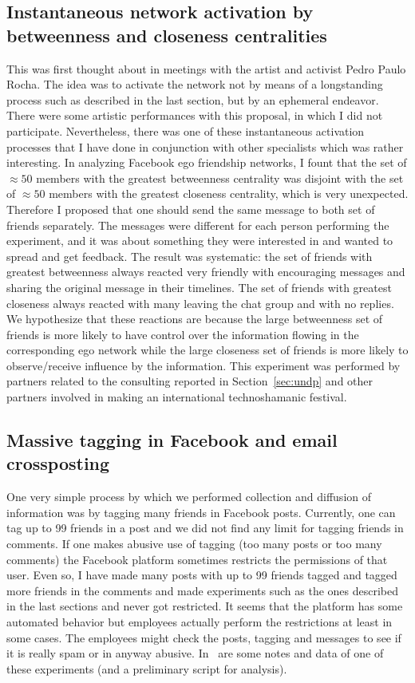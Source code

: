 \begin{apendicesenv}
\subsection{Instantaneous network activation by betweenness and closeness centralities}
This was first thought about in meetings with the artist and activist Pedro Paulo Rocha.
The idea was to activate the network not by means of a longstanding process such
as described in the last section, but by an ephemeral endeavor.
There were some artistic performances with this proposal, in which I did
not participate.
Nevertheless, there was one of these instantaneous activation processes that
I have done in conjunction with other specialists which was rather interesting.
In analyzing Facebook ego friendship networks, I fount that the set of $\approx 50$ members with
the greatest betweenness centrality was disjoint with the set of $\approx 50$ members
with the greatest closeness centrality, which is very unexpected.
Therefore I proposed that one should send the same message to both set of friends separately.
The messages were different for each person performing the experiment,
and it was about something they were interested in and wanted to spread and get feedback.
The result was systematic: the set of friends with greatest betweenness always reacted very friendly
with encouraging messages and sharing the original message in their timelines.
The set of friends with greatest closeness always reacted with many leaving the chat group
and with no replies.
We hypothesize that these reactions are because the large betweenness set of friends is more
likely to have control over the information flowing in the corresponding ego network while
the large closeness set of friends is more likely to observe/receive influence by the information.
This experiment was performed by partners related to the consulting reported in Section~\ref{sec:undp}
and other partners involved in making an international technoshamanic festival.

\subsection{Massive tagging in Facebook and email crossposting}
One very simple process by which we performed collection and diffusion of information
was by tagging many friends in Facebook posts.
Currently, one can tag up to 99 friends in a post
and we did not find any limit for tagging friends in comments.
If one makes abusive use of tagging (too many posts or too many comments)
the Facebook platform sometimes restricts the permissions of that user.
Even so, I have made many posts with up to 99 friends tagged and tagged more
friends in the comments and made experiments such as the ones described in the
last sections and never got restricted.
It seems that the platform has some automated behavior but employees actually
perform the restrictions at least in some cases.
The employees might check the posts, tagging and messages to see if it is
really spam or in anyway abusive.
In~\cite{anExp} are some notes and data of one of these experiments (and a preliminary script for analysis).


\end{apendicesenv}
